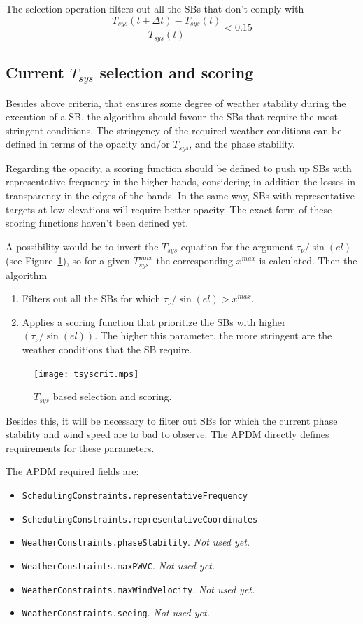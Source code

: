 \documentclass{article}
\begin{document}
The selection operation filters out all the SBs that don't comply with
$$
\frac{T_{sys}(t+\Delta t) - T_{sys}(t)}{T_{sys}(t)} < 0.15
$$

\subsection{Current $T_{sys}$ selection and scoring}

Besides above criteria, that ensures some degree of weather stability during the execution
of a SB, the algorithm should
favour the SBs that require the most stringent conditions. The stringency of the
required weather conditions can be defined in terms of the opacity and/or $T_{sys}$,
and the phase stability.

Regarding the opacity, a scoring function should be defined to push up SBs with
representative frequency in the higher bands, considering in addition the losses in transparency
in the edges of the bands. In the same way, SBs with representative targets
at low elevations will require better opacity. The exact form of these scoring functions
haven't been defined yet.

A possibility would be to invert the $T_{sys}$ equation for the argument $\tau_\nu/\sin(el)$
(see Figure~\ref{fig:tsyscrit}),
so for a given $T_{sys}^{max}$ the corresponding $x^{max}$ is calculated.
Then the algorithm
\begin{enumerate}
\item Filters out all the SBs for which $\tau_\nu/\sin(el) > x^{max}$.
\item Applies a scoring function that prioritize the SBs with higher
$(\tau_\nu/\sin(el))$. The higher this parameter, the more stringent are 
the weather conditions that the SB require.
\end{enumerate}

\begin{figure}
\texttt{[image: tsyscrit.mps]}
\caption{$T_{sys}$ based selection and scoring.}
\label{fig:tsyscrit}
\end{figure}


Besides this, it will be necessary to filter out SBs for which the
current phase stability  and wind speed are to bad to observe.
The APDM directly defines requirements for these parameters.

The APDM required fields are:
\begin{itemize}
\item {\tt SchedulingConstraints.representativeFrequency}
\item {\tt SchedulingConstraints.representativeCoordinates}
\item {\tt WeatherConstraints.phaseStability}. {\em Not used yet.}
\item {\tt WeatherConstraints.maxPWVC}. {\em Not used yet.}
\item {\tt WeatherConstraints.maxWindVelocity}. {\em Not used yet.}
\item {\tt WeatherConstraints.seeing}. {\em Not used yet.}
\end{itemize}
\end{document}
